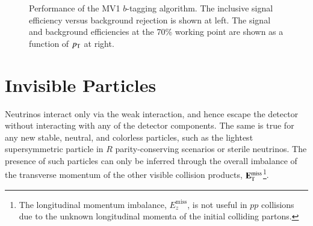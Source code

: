 \begin{figure}[htbp]
	\centering
	\hfill
	\caption{Performance of the MV1 $b$-tagging algorithm. The inclusive signal efficiency versus background rejection is shown at left. The signal and background efficiencies at the 70\% working point are shown as a function of $p_{\text{T}}$ at right.}
	\label{fig:reco-b-tagging-efficiency}
\end{figure}


\section{Invisible Particles}\label{sec:reco-met}
Neutrinos interact only via the weak interaction, and hence escape the detector without interacting with any of the detector components. The same is true for any new stable, neutral, and colorless particles, such as the lightest supersymmetric particle in $R$ parity-conserving scenarios or sterile neutrinos. The presence of such particles can only be inferred through the overall imbalance of the transverse momentum of the other visible collision products, $\mathbf{E}_{\mathrm{T}}^{\mathrm{miss}}$\footnote{The longitudinal momentum imbalance, $E_{z}^{\mathrm{miss}}$, is not useful in $pp$ collisions due to the unknown longitudinal momenta of the initial colliding partons.}. 

